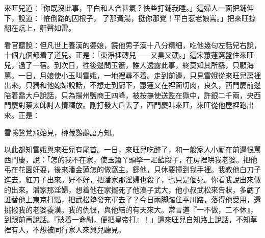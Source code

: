 {}來旺兒道：「你既沒此事，{}平白和人合甚氣？{}快些打鋪我睡。」這婦人一面把鋪伸下，說道：「恠倒路的囚根子，𠳹了那黃湯，挺你那覺！平白惹老娘罵。」把來旺掠翻在炕上，鼾聲如雷。

看官聽說：但凡世上養漢的婆娘，饒他男子漢十八分精細，吃他幾句左話兒右說，十個九個都着了道兒。正是：「東淨裡磚兒——又臭又硬。」這宋蕙蓮窩盤住來旺兒，過了一宿。到次日，徃後邊問玉簫，誰人透露此事，終莫知其所繇，只顧海罵。一日，月娘使小玉叫雪娥，一地裡尋不着。走到前邊，只見雪娥從來旺兒房裡出來，只猜和他媳婦說話，不想走到廚下，蕙蓮又在裡面切肉，良久，西門慶前邊陪着喬大戶說話，只為揚州鹽商王四峰，被按撫使送監在獄中，許銀二千兩，央西門慶對蔡太師討人情釋放。剛打發大戶去了，西門慶叫來旺，來旺從他屋裡跑出來。正是：

雪隱鷺鶯飛始見，桺藏鸚鵡語方知。

以此都知雪娥與來旺兒有尾首。一日，來旺兒吃醉了，和一般家人小厮在前邊恨罵西門慶，說：「怎的我不在家，使玉簫丫頭拏一疋藍段子，在房裡哄我老婆。把他弔在花園奸耍，後來潘金蓮怎的做窩主。繇他，只休要撞到我手裡。我教他白刀子進去，紅刀子出來。好不好，把潘家那淫婦也殺了，也只是個死。你看我說出來做的出來。潘家那淫婦，想着他在家擺死了他漢子武大，他小叔武松來告狀，多虧了誰替他上東京打點，把武松墊發充軍去了？今日兩脚踏住平川路，落得他受用，還挑撥我的老婆養漢。我的仇恨，與他結的有天來大。常言道『一不做，二不休』，到跟前再說話。『破着一命剮，便把皇帝打』！」{}這來旺兒自知路上說話，不知草裡有人，不想被同行家人來興兒聽見。


